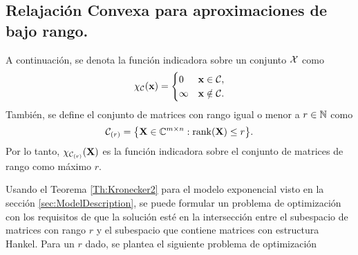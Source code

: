     \subsection{Relajación Convexa para aproximaciones de bajo rango.}
    A continuación, se denota la función indicadora sobre un conjunto $\mathcal{X}$ como
	\begin{equation}
		\chi_{\mathcal{C}}(\mathbf{x}) = \begin{cases} 0 & \mathbf{x}\in\mathcal{C},\\
			\infty & \mathbf{x}\notin\mathcal{C}.
		\end{cases} 
		\label{eq:indicator}
	\end{equation}
	También, se define el conjunto de matrices con rango igual o menor a $r\in\mathbb{N}$ como
	\begin{equation}
		\mathcal{C}_{(r)} = \big\{\mathbf{X}\in\mathbb{C}^{m\times n}:\mathrm{rank}(\mathbf{X})\leq r\big\}.
		\label{Eq:SetRank_r}
	\end{equation}
	Por lo tanto, $\chi_{\mathcal{C}_{(r)}}(\mathbf{X})$ es la función indicadora sobre el conjunto de matrices de rango como máximo $r$.

	Usando el Teorema \ref{Th:Kronecker2} para el modelo exponencial visto en la sección \ref{sec:ModelDescription}, se puede formular un problema de optimización con los requisitos de que la solución esté en la intersección entre el subespacio de matrices con rango $r$ y el subespacio que contiene matrices con estructura Hankel. Para un $r$ dado, se plantea el siguiente problema de optimización

